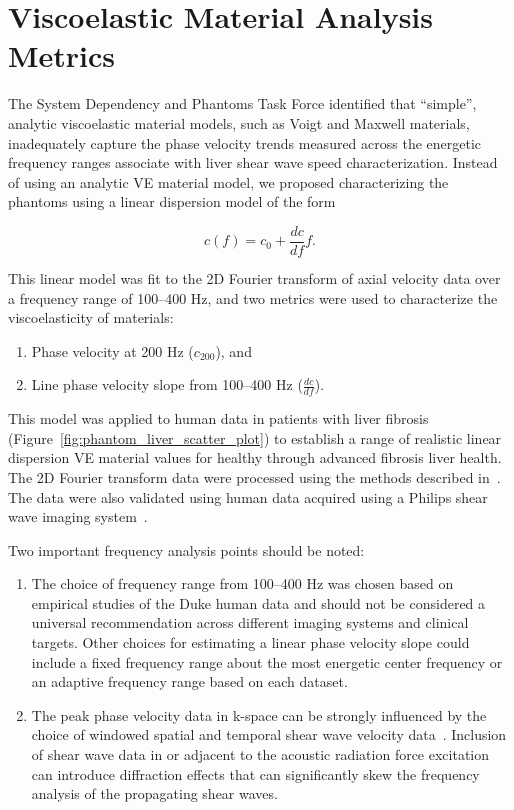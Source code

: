 \section{Viscoelastic Material Analysis Metrics}\label{sect:ve_analysis}

The System Dependency and Phantoms Task Force identified that ``simple'',
analytic viscoelastic material models, such as Voigt and Maxwell materials,
inadequately capture the phase velocity trends measured across the energetic
frequency ranges associate with liver shear wave speed characterization.
Instead of using an analytic VE material model, we proposed characterizing the
phantoms using a linear dispersion model of the form

\begin{equation}
c(f) = c_0 + \frac{dc}{df} f.
\end{equation}

This linear model was fit to the 2D Fourier transform of axial velocity data
over a frequency range of 100--400 Hz, and two metrics were used to
characterize the viscoelasticity of materials:

\begin{enumerate}
    \item Phase velocity at 200 Hz ($c_{200}$), and
    \item Line phase velocity slope from 100--400 Hz ($\frac{dc}{df}$).
\end{enumerate}

This model was applied to human data in patients with liver
fibrosis~\cite{Palmeri2011} (Figure~\ref{fig:phantom_liver_scatter_plot}) to
establish a range of realistic linear dispersion VE material values for healthy
through advanced fibrosis liver health.  The 2D Fourier transform data were
processed using the methods described in~\cite{Nightingale2015,Bernal2011}.  The
data were also validated using human data acquired using a Philips shear wave
imaging system~\cite{Chen2012a}.  

Two important frequency analysis points should be noted:
\begin{enumerate}
    \item The choice of frequency range from 100--400 Hz was chosen based on
        empirical studies of the Duke human data and should not be considered a
        universal recommendation across different imaging systems and clinical
        targets.  Other choices for estimating a linear phase velocity slope
        could include a fixed frequency range about the most energetic center
        frequency or an adaptive frequency range based on each dataset.  

    \item The peak phase velocity data in k-space can be strongly influenced by
        the choice of windowed spatial and temporal shear wave velocity
        data~\cite{Harris1978}.  Inclusion of shear wave data in or adjacent to
        the acoustic radiation force excitation can introduce diffraction
        effects that can significantly skew the frequency analysis of the
        propagating shear waves.
\end{enumerate}





